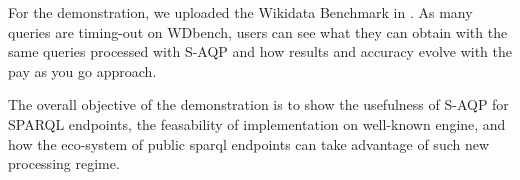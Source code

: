   For the demonstration, we uploaded the Wikidata
  Benchmark\cite{angles2022wdbench} in \NAME. As many queries are
  timing-out on WDbench, users can see what they can obtain with the
  same queries processed with S-AQP and how results and
  accuracy evolve with the pay as you go approach.

  The overall objective of the demonstration is to show the usefulness
  of S-AQP for SPARQL endpoints, the feasability of implementation on
  well-known engine, and how the eco-system of public sparql endpoints
  can take advantage of such new processing regime.












